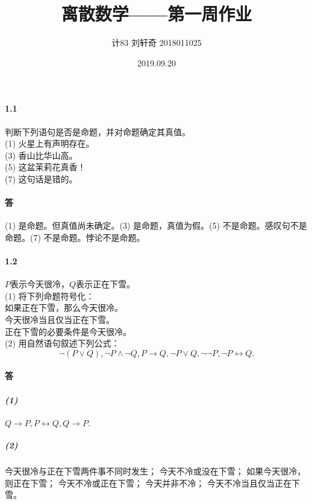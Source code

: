 \documentclass[hyperref, UTF8]{ctexart}
\title{离散数学——第一周作业}
\author{计83  刘轩奇  2018011025}
\date{2019.09.20}
\begin{document}
\maketitle

\paragraph{1.1}\label{1.1}
判断下列语句是否是命题，并对命题确定其真值。\\

\quad (1) 火星上有声明存在。 \\

\quad (3) 香山比华山高。\\

\quad (5) 这盆茉莉花真香！\\

\quad (7) 这句话是错的。\\

\paragraph{答}
(1) 是命题。但真值尚未确定。(3) 是命题，真值为假。(5) 不是命题。感叹句不是命题。(7) 不是命题。悖论不是命题。

\paragraph{1.2}\label{1.2}
$P$表示今天很冷，$Q$表示正在下雪。\\

\quad (1) 将下列命题符号化：\\

\qquad 如果正在下雪，那么今天很冷。\\

\qquad 今天很冷当且仅当正在下雪。\\

\qquad 正在下雪的必要条件是今天很冷。\\

\quad (2) 用自然语句叙述下列公式：\\

\qquad $$\lnot(P\lor Q), \lnot P \land \lnot Q, P \to Q,
\lnot P \lor Q, \lnot \lnot P, \lnot P \leftrightarrow Q. $$

\paragraph{答}
\subparagraph{(1)}
$Q\to P, P \leftrightarrow Q, Q\to P.$
\subparagraph{(2)}
今天很冷与正在下雪两件事不同时发生；
今天不冷或没在下雪；
如果今天很冷，则正在下雪；
今天不冷或正在下雪；
今天并非不冷；
今天不冷当且仅当正在下雪。
\end{document}
